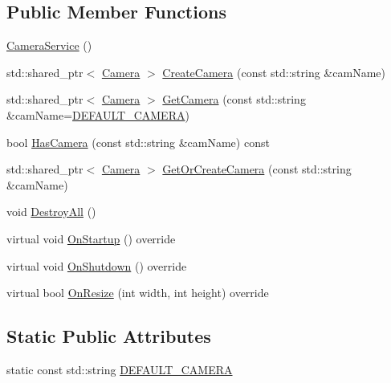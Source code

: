 \subsection*{Public Member Functions}
\begin{DoxyCompactItemize}
\item 
\hyperlink{classastu_1_1suite2d_1_1CameraService_a2c77c9b8dbc01ef54797cb4c58569a50}{Camera\+Service} ()
\item 
std\+::shared\+\_\+ptr$<$ \hyperlink{classastu_1_1suite2d_1_1Camera}{Camera} $>$ \hyperlink{classastu_1_1suite2d_1_1CameraService_a6a249aa14317fe758898db2114bd9848}{Create\+Camera} (const std\+::string \&cam\+Name)
\item 
std\+::shared\+\_\+ptr$<$ \hyperlink{classastu_1_1suite2d_1_1Camera}{Camera} $>$ \hyperlink{classastu_1_1suite2d_1_1CameraService_a4ded9fceaa3da9f887f3de7810f301c7}{Get\+Camera} (const std\+::string \&cam\+Name=\hyperlink{classastu_1_1suite2d_1_1CameraService_ae92f5163a54b2ab8dd738cadee8f75eb}{D\+E\+F\+A\+U\+L\+T\+\_\+\+C\+A\+M\+E\+RA})
\item 
bool \hyperlink{classastu_1_1suite2d_1_1CameraService_a00f6b9d4898b70f7412efb21acd91271}{Has\+Camera} (const std\+::string \&cam\+Name) const
\item 
std\+::shared\+\_\+ptr$<$ \hyperlink{classastu_1_1suite2d_1_1Camera}{Camera} $>$ \hyperlink{classastu_1_1suite2d_1_1CameraService_aacd4b3d010851ebc0d3cce0453f87624}{Get\+Or\+Create\+Camera} (const std\+::string \&cam\+Name)
\item 
void \hyperlink{classastu_1_1suite2d_1_1CameraService_a7a7d3b4a1fcbfd7c1a3d2b6db1d33d82}{Destroy\+All} ()
\item 
virtual void \hyperlink{classastu_1_1suite2d_1_1CameraService_ac86690e80a0d6805abde747e501460ee}{On\+Startup} () override
\item 
virtual void \hyperlink{classastu_1_1suite2d_1_1CameraService_ae820e7576e925c559b773bb0dbd5f091}{On\+Shutdown} () override
\item 
virtual bool \hyperlink{classastu_1_1suite2d_1_1CameraService_a4229a725df31a9e416240f4b32040cdd}{On\+Resize} (int width, int height) override
\end{DoxyCompactItemize}
\subsection*{Static Public Attributes}
\begin{DoxyCompactItemize}
\item 
static const std\+::string \hyperlink{classastu_1_1suite2d_1_1CameraService_ae92f5163a54b2ab8dd738cadee8f75eb}{D\+E\+F\+A\+U\+L\+T\+\_\+\+C\+A\+M\+E\+RA}
\end{DoxyCompactItemize}
